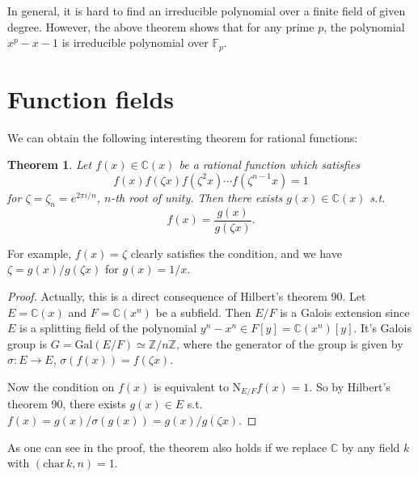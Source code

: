 \documentclass{article}
\newtheorem{theorem}{Theorem}
\newcommand{\Gal}{\mathrm{Gal}}
\newcommand{\Nm}{\mathrm{N}}
\newcommand{\cha}{\mathrm{char}\,}
\begin{document}
In general, it is hard to find an irreducible polynomial over a finite field of given degree. However, the above theorem shows that for any prime $p$, the polynomial $x^{p} - x -1$ is irreducible polynomial over $\mathbb{F}_{p}$.




\section{Function fields}
We can obtain the following interesting theorem for rational functions:
\begin{theorem}
Let $f(x)\in \mathbb{C}(x)$ be a rational function which satisfies 
$$
f(x) f(\zeta x) f(\zeta^{2}x) \cdots f(\zeta^{n-1}x) = 1
$$
for $\zeta = \zeta_{n} = e^{2\pi i/n}$, $n$-th root of unity. Then there exists $g(x)\in \mathbb{C}(x)$ s.t. 
$$
f(x) = \frac{g(x)}{g(\zeta x)}.
$$
\end{theorem}
For example, $f(x) = \zeta$ clearly satisfies the condition, and we have $\zeta = g(x)/g(\zeta x)$ for $g(x) = 1/x$.
\begin{proof} 
Actually, this is a direct consequence of Hilbert's theorem 90. Let $E = \mathbb{C}(x)$ and $F = \mathbb{C}(x^{n})$ be a subfield. 
Then $E/F$ is a Galois extension since $E$ is a splitting field of the polynomial $y^{n} - x^{n} \in F[y] = \mathbb{C}(x^{n})[y]$. 
It's Galois group is $G = \Gal(E/F) \simeq\mathbb{Z}/n\mathbb{Z}$, where the generator of the group is given by $\sigma:E\to E$, $\sigma(f(x)) = f(\zeta x)$. 

Now the condition on $f(x)$ is equivalent to $\Nm_{E/F}f(x) = 1$. So by Hilbert's theorem 90, there exists $g(x)\in E$ s.t. $f(x) = g(x)/\sigma(g(x)) = g(x)/g(\zeta x)$. 
\end{proof}
As one can see in the proof, the theorem also holds if we replace $\mathbb{C}$ by any field $k$ with $(\cha k, n) = 1$. 
\end{document}
